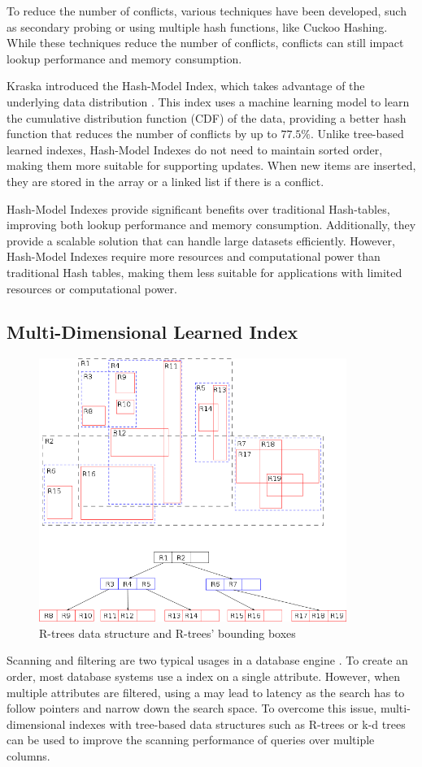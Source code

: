 To reduce the number of conflicts, various techniques have been developed, such as secondary probing or using multiple hash functions, like Cuckoo Hashing. While these techniques reduce the number of conflicts, conflicts can still impact lookup performance and memory consumption.

Kraska introduced the Hash-Model Index, which takes advantage of the underlying data distribution \cite{CasedLearnedIndex}. This index uses a machine learning model to learn the cumulative distribution function (CDF) of the data, providing a better hash function that reduces the number of conflicts by up to $77.5\%$. Unlike tree-based learned indexes, Hash-Model Indexes do not need to maintain sorted order, making them more suitable for supporting updates. When new items are inserted, they are stored in the array or a linked list if there is a conflict.

Hash-Model Indexes provide significant benefits over traditional Hash-tables, improving both lookup performance and memory consumption. Additionally, they provide a scalable solution that can handle large datasets efficiently. However, Hash-Model Indexes require more resources and computational power than traditional Hash tables, making them less suitable for applications with limited resources or computational power. 

\subsection{Multi-Dimensional Learned Index}
\begin{figure}
    \centering
    \includegraphics[width=100mm,scale=1]{Figures/R-tree.png}
    \caption{
        R-trees data structure and R-trees' bounding boxes 
    }
    \label{fig:R-tree}
\end{figure}
Scanning and filtering are two typical usages in a database engine \cite{FloodLMD}. To create an order, most database systems use a \btree index on a single attribute. However, when multiple attributes are filtered, using a \btree may lead to latency as the search has to follow pointers and narrow down the search space. To overcome this issue, multi-dimensional indexes with tree-based data structures such as R-trees \cite{r-tree} or k-d trees \cite{kdtree} can be used to improve the scanning performance of queries over multiple columns.

